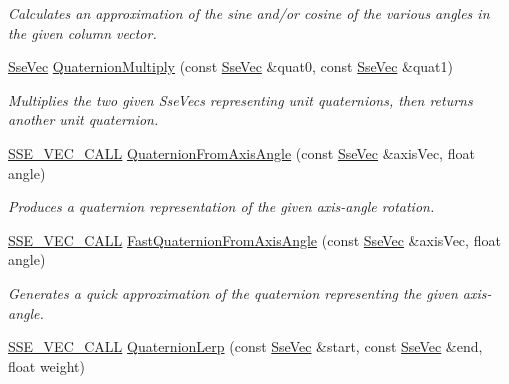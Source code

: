 \begin{DoxyCompactItemize}
\begin{DoxyCompactList}\small\item\em Calculates an approximation of the sine and/or cosine of the various angles in the given column vector. \end{DoxyCompactList}\item 
\hyperlink{namespacegofxmath_a634570ddcd2496053ee966227080e02f}{Sse\+Vec} \hyperlink{group___s_i_m_d_vec_math_ga0e384fad353b857ff4ef591d332f1ed5}{Quaternion\+Multiply} (const \hyperlink{namespacegofxmath_a634570ddcd2496053ee966227080e02f}{Sse\+Vec} \&quat0, const \hyperlink{namespacegofxmath_a634570ddcd2496053ee966227080e02f}{Sse\+Vec} \&quat1)
\begin{DoxyCompactList}\small\item\em Multiplies the two given Sse\+Vecs representing unit quaternions, then returns another unit quaternion. \end{DoxyCompactList}\item 
\hyperlink{ssevec__math__defs_8h_a97454f977a5281455cecacce1e8ba670}{S\+S\+E\+\_\+\+V\+E\+C\+\_\+\+C\+A\+L\+L} \hyperlink{group___s_i_m_d_vec_math_gaa2b75972dcdfee3ce9416c181e3232c4}{Quaternion\+From\+Axis\+Angle} (const \hyperlink{namespacegofxmath_a634570ddcd2496053ee966227080e02f}{Sse\+Vec} \&axis\+Vec, float angle)
\begin{DoxyCompactList}\small\item\em Produces a quaternion representation of the given axis-\/angle rotation. \end{DoxyCompactList}\item 
\hyperlink{ssevec__math__defs_8h_a97454f977a5281455cecacce1e8ba670}{S\+S\+E\+\_\+\+V\+E\+C\+\_\+\+C\+A\+L\+L} \hyperlink{group___s_i_m_d_vec_math_gafc7d80c6545a113babc44f60d858982d}{Fast\+Quaternion\+From\+Axis\+Angle} (const \hyperlink{namespacegofxmath_a634570ddcd2496053ee966227080e02f}{Sse\+Vec} \&axis\+Vec, float angle)
\begin{DoxyCompactList}\small\item\em Generates a quick approximation of the quaternion representing the given axis-\/angle. \end{DoxyCompactList}\item 
\hyperlink{ssevec__math__defs_8h_a97454f977a5281455cecacce1e8ba670}{S\+S\+E\+\_\+\+V\+E\+C\+\_\+\+C\+A\+L\+L} \hyperlink{group___s_i_m_d_vec_math_ga42795c54ec5735bb7aa2a164d3e6ed5c}{Quaternion\+Lerp} (const \hyperlink{namespacegofxmath_a634570ddcd2496053ee966227080e02f}{Sse\+Vec} \&start, const \hyperlink{namespacegofxmath_a634570ddcd2496053ee966227080e02f}{Sse\+Vec} \&end, float weight)

\end{DoxyCompactItemize}
